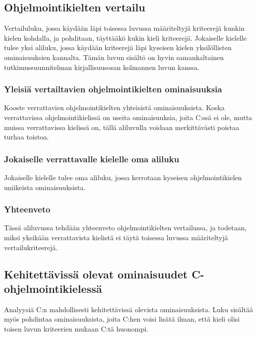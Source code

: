 \subsection{Ohjelmointikielten vertailu}

Vertailuluku, jossa käydään läpi toisessa luvussa määriteltyjä kriteerejä
kunkin kielen kohdalla, ja pohditaan, täyttääkö kukin kieli kriteerejä.
Jokaiselle kielelle tulee yksi aliluku, jossa käydään kriteerejä läpi kyseisen
kielen yksilöllisten ominaisuuksien kannalta. Tämän luvun sisältö on hyvin
samankaltainen tutkimussuunnitelman kirjallisuusosan kolmannen luvun kanssa.

\subsubsection{Yleisiä vertailtavien ohjelmointikielten ominaisuuksia}

Kooste verrattavien ohjelmointikielten yhteisistä ominaisuuksista. Koska
verrattavissa ohjelmointikielissä on useita ominaisuuksia, joita C:ssä ei ole,
mutta muissa verrattavissa kielissä on, tällä aliluvulla voidaan merkittävästi
poistaa turhaa toistoa.

\subsubsection{Jokaiselle verrattavalle kielelle oma aliluku}

Jokaiselle kielelle tulee oma aliluku, jossa kerrotaan kyseisen
ohjelmointikielen uniikeista ominaisuuksista.

\subsubsection{Yhteenveto}

Tässä aliluvussa tehdään yhteenveto ohjelmointikielten vertailussa, ja
todetaan, miksi yksikään verrattavista kielistä ei täytä toisessa luvussa
määriteltyjä vertailukriteerejä.

\subsection{Kehitettävissä olevat ominaisuudet C-ohjelmointikielessä}

Analyysiä C:n mahdollisesti kehitettävissä olevista ominaisuuksista. Luku
sisältää myös pohdintaa ominaisuuksista, joita C:hen voisi lisätä ilman, että
kieli olisi toisen luvun kriteerien mukaan C:tä huonompi.

